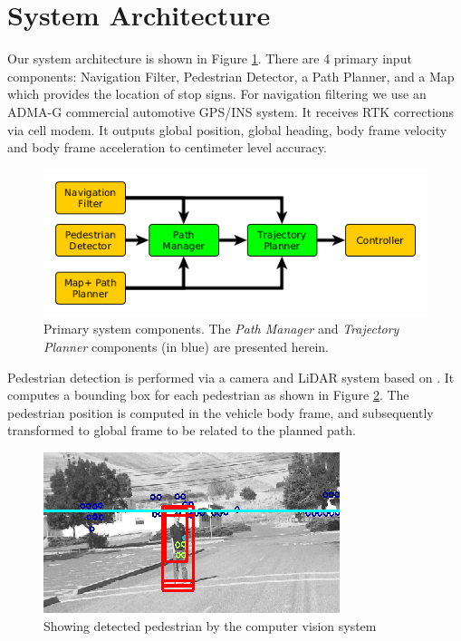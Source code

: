 \documentclass[letterpaper, 10 pt, conference]{ieeeconf}  %
\begin{document}

\section{System Architecture} \label{sec:systemarchirecture}

Our system architecture is shown in Figure \ref{fig:addreact}.
There are 4 primary input components: Navigation Filter, Pedestrian Detector, a Path Planner, and a Map which provides the location of stop signs.
For navigation filtering we use an ADMA-G  commercial automotive GPS/INS system.
It receives RTK corrections via cell modem.
It outputs global position, global heading, body frame velocity and body frame acceleration to centimeter level accuracy.

\begin{figure}[thpb]
  \centering
  \includegraphics[width=1.0\columnwidth]{graphics/MissingReactionPiece2.png}
  \caption{
    Primary system components. The {\it Path Manager} and {\it Trajectory Planner} components (in blue) are presented herein.
  }
  \label{fig:addreact}
\end{figure}

Pedestrian detection is performed via a camera and LiDAR system based on \cite{Gepperth2013,Gepperth2014}.
It computes a bounding box for each pedestrian as shown in Figure \ref{fig:ped}.
The pedestrian position is computed in the vehicle body frame, and subsequently transformed to global frame to be related to the planned path.

\begin{figure}[thpb]
  \centering
  \includegraphics[width=0.5\columnwidth]{graphics/ped3.png}
  \caption{Showing detected pedestrian by the computer vision system
  \newline
  }
  \label{fig:ped}
\end{figure}
\end{document}
